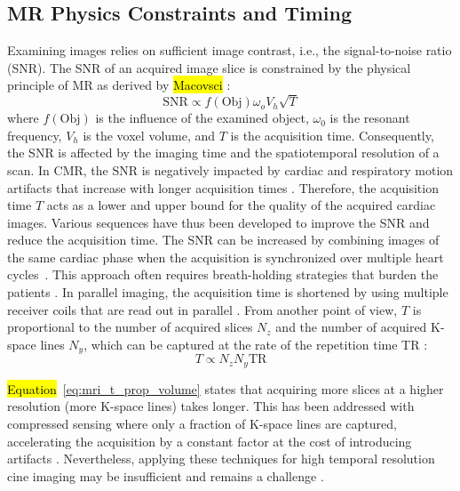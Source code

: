     \subsection{MR Physics Constraints and Timing}
   Examining images relies on sufficient image contrast, i.e., the signal-to-noise ratio (SNR). The SNR of an acquired image slice is constrained by the physical principle of MR as derived by \hl{Macovsci} \cite{macovski1996noise}: %
        \begin{equation}
        \text{SNR} \propto f\left(\text{Obj}\right) \omega_o V_h \sqrt{T}
        \label{eq:mri_snr}
    \end{equation}
    where $f\left(\text{Obj}\right)$ is the influence of the examined object, $\omega_0$ is the resonant frequency, $V_h$ is the voxel volume, and $T$ is the acquisition time.
    Consequently, the SNR is affected by the imaging time and the spatiotemporal resolution of a scan.
    In CMR, the SNR is negatively impacted by cardiac and respiratory motion artifacts that increase with longer acquisition times \cite{ismail2022cardiac}.
    Therefore, the acquisition time $T$ acts as a lower and upper bound for the quality of the acquired cardiac images. Various sequences have thus been developed to improve the SNR and reduce the acquisition time.
    The SNR can be increased by combining images of the same cardiac phase when the acquisition is synchronized over multiple heart cycles~\cite{ismail2022cardiac}. This approach often requires breath-holding strategies that burden the patients \cite{ridgway2010cardiovascular}.
    In parallel imaging, the acquisition time is shortened by using
    multiple receiver coils that are read out in parallel \cite{pruessmann1999sense, griswold2002generalized,ridgway2010cardiovascular}.
    From another point of view, $T$ is proportional to the number of acquired slices $N_z$ and the number of acquired K-space lines $N_y$, which can be captured at the rate of the repetition time TR \cite{balaban2019basic}:
    \begin{equation}
        T \propto  N_z N_y \text{TR}
        \label{eq:mri_t_prop_volume}
    \end{equation}

\hl{Equation} %
 \,\eqref{eq:mri_t_prop_volume} states that acquiring more slices at a higher resolution (more K-space lines) takes longer. This has been addressed with compressed sensing where only a fraction of K-space lines are captured, accelerating the acquisition by a constant factor at the cost of introducing artifacts \cite{lustig2007sparse}.
    Nevertheless, applying these techniques for high temporal resolution cine imaging may be insufficient and remains a challenge \cite{raman202230}.


